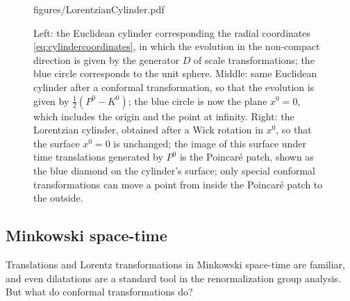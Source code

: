 \documentclass[a4paper,12pt]{article}
\numberwithin{equation}{section}
\begin{document}
\begin{figure}
	{figures/LorentzianCylinder.pdf}
	\caption{Left: the Euclidean cylinder corresponding the radial
	coordinates \eqref{eq:cylindercoordinates}, in which
	the evolution in the non-compact direction is given by
	the generator $D$ of scale transformations;
	the blue circle corresponds to the unit sphere.
	Middle: same Euclidean cylinder after a conformal transformation,
	so that the evolution is given by $\frac{1}{2} (P^0 - K^0)$;
	the blue circle is now the plane $x^0 = 0$, which includes
	the origin and the point at infinity.
	Right: the Lorentzian cylinder, obtained after a Wick rotation
	in $x^0$, so that the surface $x^0 = 0$ is unchanged;
	the image of this surface under time translations 
	generated by $P^0$ is the Poincaré patch, shown as 
	the blue diamond on the cylinder's surface;
	only special conformal transformations can move a point
	from inside the Poincaré patch to the outside.}
	\label{fig:cylinders}
\end{figure}

\subsection{Minkowski space-time}

Translations and Lorentz transformations in Minkowski space-time are familiar, and even dilatations are a standard tool in the renormalization group analysis. But what do conformal transformations do?
\end{document}

